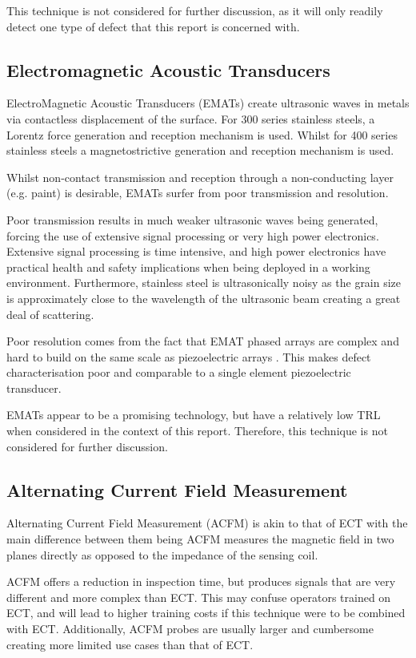 \documentclass[a4paper,twoside,11pt]{article}
\begin{document}
This technique is not considered for further discussion, as it will only readily detect one type of defect that this report is concerned with.


\subsection{Electromagnetic Acoustic Transducers}

ElectroMagnetic Acoustic Transducers (EMATs) create ultrasonic waves in metals via contactless displacement of the surface. 
For 300 series stainless steels, a Lorentz force generation and reception mechanism is used. Whilst for 400 series stainless steels a magnetostrictive generation and reception mechanism is used. 

Whilst non-contact transmission and reception through a non-conducting layer (e.g. paint) is desirable, EMATs surfer from poor transmission and resolution. 

Poor transmission results in much weaker ultrasonic waves being generated, forcing the use of extensive signal processing or very high power electronics. 
Extensive signal processing is time intensive, and high power electronics have practical health and safety implications when being deployed in a working environment. Furthermore, stainless steel is ultrasonically noisy as the grain size is approximately close to the wavelength of the ultrasonic beam creating a great deal of scattering. 

Poor resolution comes from the fact that EMAT phased arrays are complex and hard to build on the same scale as piezoelectric arrays  \cite{islaEMATPhasedArray2017}. 
This makes defect characterisation poor and comparable to a single element piezoelectric transducer.

EMATs appear to be a promising technology, but have a relatively low TRL when considered in the context of this report.
Therefore, this technique is not considered for further discussion. 

\subsection{Alternating Current Field Measurement}

Alternating Current Field Measurement (ACFM) is akin to that of ECT with the main difference between them being ACFM measures the magnetic field in two planes directly as opposed to the impedance of the sensing coil.

ACFM offers a reduction in inspection time, but produces signals that are very different and more complex than ECT. This may confuse operators trained on ECT, and will lead to higher training costs if this technique were to be combined with ECT. Additionally, ACFM probes are usually larger and cumbersome creating more limited use cases than that of ECT.
\end{document}
